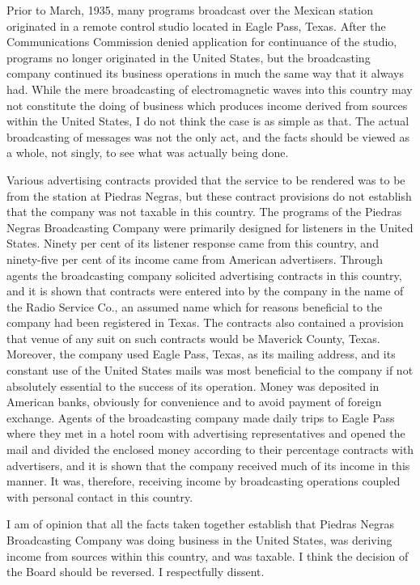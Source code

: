 \begin{select}
Prior to March, 1935, many programs broadcast over the Mexican station originated in a remote control studio located in Eagle Pass, Texas. After the Communications Commission denied application for continuance of the studio, programs no longer originated in the United States, but the broadcasting company continued its business operations in much the same way that it always had. While the mere broadcasting of electromagnetic waves into this country may not constitute the doing of business which produces income derived from sources within the United States, I do not think the case is as simple as that. The actual broadcasting of messages was not the only act, and the facts should be viewed as a whole, not singly, to see what was actually being done.

Various advertising contracts provided that the service to be rendered was to be from the station at Piedras Negras, but these contract provisions do not establish that the company was not taxable in this country. The programs of the Piedras Negras Broadcasting Company were primarily designed for listeners in the United States. Ninety per cent of its listener response came from this country, and ninety-five per cent of its income came from American advertisers. Through agents the broadcasting company solicited advertising contracts in this country, and it is shown that contracts were entered into by the company in the name of the Radio Service Co., an assumed name which for reasons beneficial to the company had been registered in Texas. The contracts also contained a provision that venue of any suit on such contracts would be Maverick County, Texas. Moreover, the company used Eagle Pass, Texas, as its mailing address, and its constant use of the United States mails was most beneficial to the company if not absolutely essential to the success of its operation. Money was deposited in American banks, obviously for convenience and to avoid payment of foreign exchange. Agents of the broadcasting company made daily trips to Eagle Pass where they met in a hotel room with advertising representatives and opened the mail and divided the enclosed money according to their percentage contracts with advertisers, and it is shown that the company received much of its income in this manner. It was, therefore, receiving income by broadcasting operations coupled with personal contact in this country.

I am of opinion that all the facts taken together establish that Piedras Negras Broadcasting Company was doing business in the United States, was deriving income from sources within this country, and was taxable. I think the decision of the Board should be reversed. I respectfully dissent.
\end{select}

